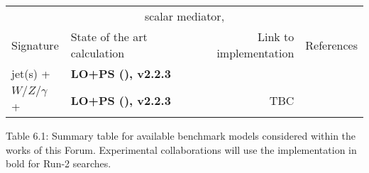 \begin{footnotesize}
\begin{table}
\begin{tabular}{llrr}
	\cmidrule(r){2-4} 
	\multicolumn{4}{c}{scalar mediator, \tchannel}\\
	\cmidrule(r){2-4} 
	Signature & State of the art calculation & Link to implementation & References \\ 
		\cmidrule(r){1-4} 
		
	jet(s) + \MET{} & \textbf{LO+PS (\madgraph), v2.2.3} & \cite{ForumSVN_TChannel}& \cite{Papucci:2014iwa} \\ 
	$W/Z/\gamma$ + \MET{} & \textbf{LO+PS (\madgraph), v2.2.3} & TBC  & \cite{Alwall:2014hca,Alloul:2013bka,Degrande:2011ua}\\ 
		
%	
	
	\bottomrule 
	\end{tabular}
	\label{tab:summaryModels}
\end{table}

\end{footnotesize}

\begin{center}
	Table 6.1: Summary table for available benchmark models considered within the works of this Forum. Experimental collaborations will use the implementation in bold for Run-2 searches. 
\end{center}
